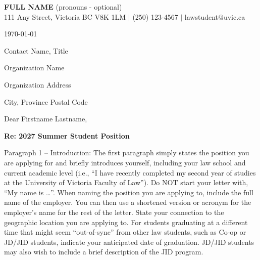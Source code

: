 \documentclass[letterpaper,11pt]{article}
\begin{document}

\begin{center}
    \textbf{\huge \uppercase{Full Name}} \textnormal{(pronouns - optional)}\\ \vspace{1pt}
    \small 111 Any Street, Victoria BC V8K 1LM $|$ (250) 123-4567 $|$ lawstudent@uvic.ca 
\end{center}


\today \par 

\vspace{8pt}

Contact Name, Title\par \vspace{-1pt}
Organization Name\par \vspace{-1pt}
Organization Address\par \vspace{-1pt}
City, Province Postal Code\par 

\vspace{8pt}

Dear Firstname Lastname, 
\par \vspace{8pt}
\textbf{Re: 2027 Summer Student Position}
\par \vspace{8pt}


Paragraph 1 – Introduction: The first paragraph simply states the position you are applying for and briefly introduces
yourself, including your law school and current academic level (i.e., “I have recently completed my second year of studies
at the University of Victoria Faculty of Law”). Do NOT start your letter with, “My name is …”. When naming the
position you are applying to, include the full name of the employer. You can then use a shortened version or acronym for
the employer’s name for the rest of the letter. State your connection to the geographic location you are applying to. For
students graduating at a different time that might seem “out-of-sync” from other law students, such as Co-op or JD/JID
students, indicate your anticipated date of graduation. JD/JID students may also wish to include a brief description of the
JID program.

\par \vspace{8pt}
\end{document}

